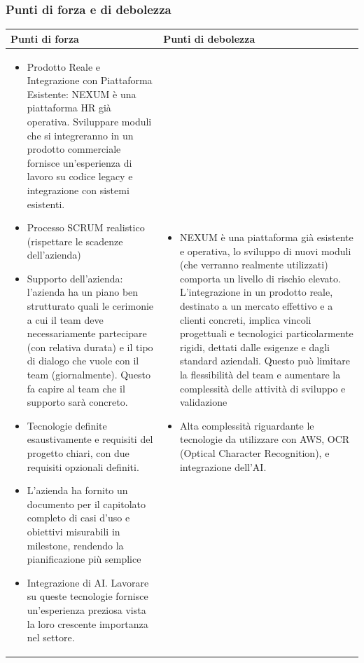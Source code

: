 \documentclass[a4paper,11pt]{article}
\begin{document}
\subsubsection{Punti di forza e di debolezza}
{\footnotesize
\begin{tabularx}{\textwidth}{|X|X|}
\hline
\rowcolor{lightgray!40} %
\textbf{Punti di forza} & \textbf{Punti di debolezza} \\
\hline
\begin{itemize}
\item Prodotto Reale e Integrazione con Piattaforma Esistente: NEXUM è una piattaforma HR già operativa. Sviluppare moduli che si integreranno in un prodotto commerciale fornisce un'esperienza di lavoro su codice legacy e integrazione con sistemi esistenti.
\item Processo SCRUM realistico (rispettare le scadenze dell’azienda)
\item Supporto dell’azienda: l’azienda ha un piano ben strutturato quali le cerimonie a cui il team deve necessariamente partecipare (con relativa durata) e il tipo di dialogo che vuole con il team (giornalmente). Questo fa capire al team che il supporto sarà concreto.
\item Tecnologie definite esaustivamente e  requisiti del progetto chiari, con due requisiti opzionali definiti.
\item L’azienda ha fornito un documento per il capitolato completo di casi d’uso e obiettivi misurabili in milestone, rendendo la pianificazione più semplice
\item Integrazione di AI. Lavorare su queste tecnologie fornisce un'esperienza preziosa vista la loro crescente importanza nel settore.
\end{itemize}
& 
\begin{itemize}
\item NEXUM è una piattaforma già esistente e operativa, lo sviluppo di nuovi moduli (che verranno realmente utilizzati) comporta un livello di rischio elevato. L’integrazione in un prodotto reale, destinato a un mercato effettivo e a clienti concreti, implica vincoli progettuali e tecnologici particolarmente rigidi, dettati dalle esigenze e dagli standard aziendali. Questo può limitare la flessibilità del team e aumentare la complessità delle attività di sviluppo e validazione
\item Alta complessità riguardante le tecnologie da utilizzare con AWS, OCR (Optical Character Recognition), e integrazione dell’AI.
\end{itemize} \\
\hline
\end{tabularx}
}
\end{document}
